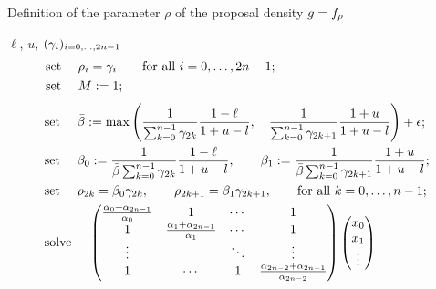 \documentclass[10pt, article,table]{article}
\begin{document}
\begin{algorithm}[h]
 \caption{Definition of the parameter $\rho$ of the proposal density $\proposalDensity = \dirichletDensity[\rho]$}
 \label{algo.set_proposal_param}
 \begin{algorithmic}
  \REQUIRE $\ell$, $u$, $(\dirparam_i)_{i=0,\dots,2n-1}$ 
  \STATE \begin{equation*}
  \begin{split}
  &\text{set } \quad \rho_i = \dirparam_i \qquad \text{for all } i=0,\dots,2n-1;
  \qquad\qquad\qquad\qquad\qquad\qquad
  \\
  &\text{set } \quad M:=1;
 \end{split}  
  \end{equation*}
  \ELSE
  \STATE 
   \begin{equation*}
   \begin{split}
  &\text{set } \quad \bar{\beta} : =
   \max\left(
   \frac{1}{\sum_{k=0}^{n-1} \dirparam_{2k}}
   \frac{1-\ell}{1+u-l}, \quad
   \frac{1}{\sum_{k=0}^{n-1} \dirparam_{2k+1}}
   \frac{1+u}{1+u-l}
   \right) + \epsilon;
  \\
  &\text{set } \quad 
   \beta_0: =
   \frac{1}{\bar{\beta}\sum_{k=0}^{n-1} \dirparam_{2k}}
   \frac{1-\ell}{1+u-l},
   \qquad
   \beta_1 :=
   \frac{1}{\bar{\beta}\sum_{k=0}^{n-1} \dirparam_{2k+1}}
   \frac{1+u}{1+u-l};
  \\
  &\text{set  } \quad \rho_{2k} = \beta_0 \dirparam_{2k}, \qquad  
  \rho_{2k+1}= \beta_1 \dirparam_{2k+1}, \qquad
  \text{for all } k=0,\dots,n-1; 
  \\
  &\text{solve } \quad 
  \begin{pmatrix}
   \frac{\alpha_{0} + \alpha_{2n-1}}{\alpha_0}
   &   1   &   \cdots   &   1
   \\
   1 &
   \frac{\alpha_{1} + \alpha_{2n-1}}{\alpha_1}
   & \cdots & 1 
   \\
   \vdots & & \ddots & \vdots\\
   1 &\cdots & 1 &
   \frac{\alpha_{2n-2} + \alpha_{2n-1}}{\alpha_{2n-2}}
  \end{pmatrix}
  \begin{pmatrix}
   x_0 \\
   x_1 \\
   \vdots \\

\end{pmatrix}
\end{split}
\end{equation*}
\end{algorithmic}
\end{algorithm}
\end{document}
